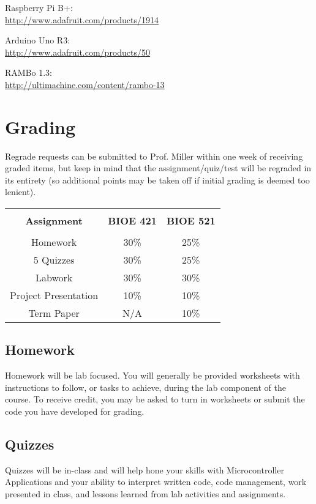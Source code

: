 \documentclass[10pt]{article}
\begin{document}
Raspberry Pi B+:\\
\href{http://www.adafruit.com/products/1914}{http://www.adafruit.com/products/1914}

Arduino Uno R3:\\
\href{http://www.adafruit.com/products/50}{http://www.adafruit.com/products/50}

RAMBo 1.3:\\
\href{http://ultimachine.com/content/rambo-13}{http://ultimachine.com/content/rambo-13}


\section*{Grading}

Regrade requests can be submitted to Prof. Miller within one week of receiving graded items, but keep in mind that the assignment/quiz/test will be regraded in its entirety (so additional points may be taken off if initial grading is deemed too lenient).

\begin{table}[ht]
\begin{tabular}{c c c}
\hline\hline
\\[-1ex]
\textbf{Assignment} & \textbf{BIOE 421} & \textbf{BIOE 521} \\ [0.5ex]
\hline
\\[-1ex]
Homework				&	30\%	&	25\%	\\[1ex]
5 Quizzes				&	30\%	&	25\%	\\[1ex]
Labwork					&	30\%	&	30\%	\\[1ex]
Project Presentation	&	10\%	&	10\%	\\[1ex]
Term Paper				&	N/A		&	10\%	\\ [1ex]\hline
\end{tabular}
\label{table:nonlin}
\end{table}


\subsection*{Homework}
Homework will be lab focused. You will generally be provided worksheets with instructions to follow, or tasks to achieve, during the lab component of the course. To receive credit, you may be asked to turn in worksheets or submit the code you have developed for grading.

\subsection*{Quizzes}
Quizzes will be in-class and will help hone your skills with Microcontroller Applications and your ability to interpret written code, code management, work presented in class, and lessons learned from lab activities and assignments.
\end{document}
